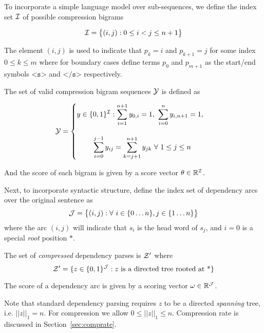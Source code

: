\documentclass[11pt,a4paper]{article}
\newcommand{\Enum}[1]{\{1 \ldots #1\}}
\newcommand{\EnumS}[2]{\{#1 \ldots #2\}}
\newcommand{\Set}[1]{\big\{ #1 \big\}}
\newcommand{\Bin}[1]{\{0,1\}^{#1}}
\newcommand{\Reals}{\mathbb{R}}
\newcommand{\IndexSet}{{\cal I}}
\newcommand{\IndexSetB}{{\cal J}}
\begin{document}
To incorporate a simple language model over sub-sequences, we define the index set ${\cal I}$ of possible compression bigrams 

\[ \IndexSet = \Set{(i,j) : 0 \leq i < j \leq n+1} \]

\noindent The element $(i,j)$ is used to indicate that $p_k = i$ and $p_{k+1}
=j$ for some index $0 \leq k \leq m$ where for boundary cases define terms $p_0$ and $p_{m+1}$ as the start/end symbols $\texttt{<s>}$ and $\texttt{</s>}$ respectively.

The set of valid compression bigram sequences ${\cal Y}$ is defined as
 
\begin{equation*}
  {\cal Y} = \begin{cases}\displaystyle y \in \Bin{\IndexSet} : 
    \sum_{i=1}^{n+1} y_{0,i} = 1,\ \sum_{i=0}^n y_{i, n+1} = 1, \\\\
    \displaystyle\ \ \ \ \ \ \
    \sum_{i=0}^{j-1} y_{ij} = \sum_{k=j+1}^{n+1} y_{jk}\  \forall\ 1\leq j \leq n  \end{cases}
\end{equation*}

\noindent And the score of each bigram is given by a score vector $\theta \in \Reals^{\IndexSet}$.






Next, to incorporate syntactic structure, define the index set of dependency arcs over the
original sentence as
\[ \IndexSetB = \Set{(i,j) : \forall \  i \in \EnumS{0}{n}, j \in \Enum{n} } \]
\noindent where the arc $(i,j)$ will indicate that $s_i$ is the head word of $s_j$, and $i=0$ is a 
special \textit{root} position $*$.    

The set of \textit{compressed} dependency parses is ${\cal Z}'$ where
\[{\cal Z }' = \{z \in \Bin{\IndexSetB}: z \hbox{ is a directed tree rooted at *} \}  \]

\noindent 
The score of a dependency arc is given by a scoring vector $\omega \in
\Reals^{\IndexSetB}$.


Note that standard dependency parsing requires $z$ to be a directed
\textit{spanning} tree, i.e. $||z||_1 = n$. For compression
we allow $0 \leq ||z||_1 \leq n$. Compression rate is discussed in 
Section~\ref{sec:comprate}.   
\end{document}
